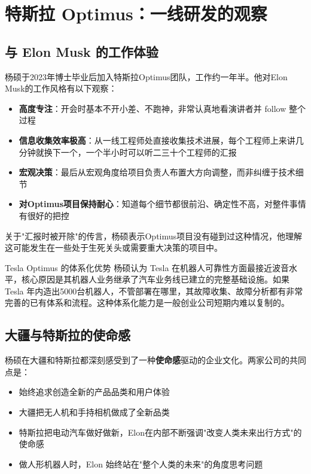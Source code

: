 \section{特斯拉 Optimus：一线研发的观察}

\subsection{与 Elon Musk 的工作体验}

杨硕于2023年博士毕业后加入特斯拉Optimus团队，工作约一年半。他对Elon Musk的工作风格有以下观察：

\begin{itemize}
    \item \textbf{高度专注}：开会时基本不开小差、不跑神，非常认真地看演讲者并 follow 整个过程
    \item \textbf{信息收集效率极高}：从一线工程师处直接收集技术进展，每个工程师上来讲几分钟就换下一个，一个半小时可以听二三十个工程师的汇报
    \item \textbf{宏观决策}：最后从宏观角度给项目负责人布置大方向调整，而非纠缠于技术细节
    \item \textbf{对Optimus项目保持耐心}：知道每个细节都很前沿、确定性不高，对整件事情有很好的把控
\end{itemize}

关于"汇报时被开除"的传言，杨硕表示Optimus项目没有碰到过这种情况，他理解这可能发生在一些处于生死关头或需要重大决策的项目中。

\begin{knowledgebox}{Tesla Optimus 的体系化优势}
杨硕认为 Tesla 在机器人可靠性方面最接近波音水平，核心原因是其机器人业务继承了汽车业务线已建立的完整基础设施。如果 Tesla 年内造出5000台机器人，不管部署在哪里，其故障收集、故障分析都有非常完善的已有体系和流程。这种体系化能力是一般创业公司短期内难以复制的。
\end{knowledgebox}

\subsection{大疆与特斯拉的使命感}

杨硕在大疆和特斯拉都深刻感受到了一种\textbf{使命感}驱动的企业文化。两家公司的共同点是：

\begin{itemize}
    \item 始终追求创造全新的产品品类和用户体验
    \item 大疆把无人机和手持相机做成了全新品类
    \item 特斯拉把电动汽车做好做新，Elon在内部不断强调"改变人类未来出行方式"的使命感
    \item 做人形机器人时，Elon 始终站在"整个人类的未来"的角度思考问题
\end{itemize}

